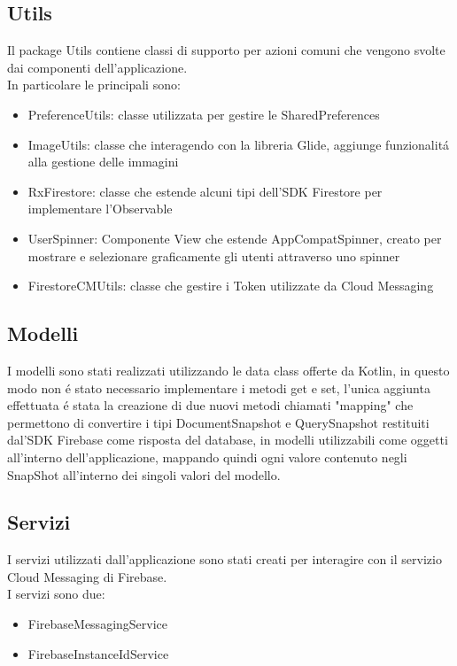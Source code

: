 \subsection{Utils}
Il package Utils contiene classi di supporto per azioni comuni che vengono svolte dai componenti dell'applicazione.\\
In particolare le principali sono:
\begin{itemize}
    \item PreferenceUtils: classe utilizzata per gestire le SharedPreferences
    \item ImageUtils: classe che interagendo con la libreria Glide, aggiunge funzionalit\'a alla gestione delle immagini
    \item RxFirestore: classe che estende alcuni tipi dell'SDK Firestore per implementare l'Observable
    \item UserSpinner: Componente View che estende AppCompatSpinner, creato per mostrare e selezionare graficamente gli utenti attraverso uno spinner
    \item FirestoreCMUtils: classe che gestire i Token utilizzate da Cloud Messaging
\end{itemize}

\subsection{Modelli}
I modelli sono stati realizzati utilizzando le data class offerte da Kotlin, in questo modo non \'e stato necessario implementare i metodi get e set, l'unica aggiunta effettuata \'e stata la creazione di due nuovi metodi chiamati "mapping" che permettono di convertire i tipi DocumentSnapshot e QuerySnapshot restituiti dal'SDK Firebase come risposta del database, in modelli utilizzabili come oggetti all'interno dell'applicazione, mappando quindi ogni valore contenuto negli SnapShot all'interno dei singoli valori del modello.


\subsection{Servizi}
I servizi utilizzati dall'applicazione sono stati creati per interagire con il servizio Cloud Messaging di Firebase.\\
I servizi sono due:
\begin{itemize}
    \item FirebaseMessagingService
    \item FirebaseInstanceIdService
\end{itemize}

